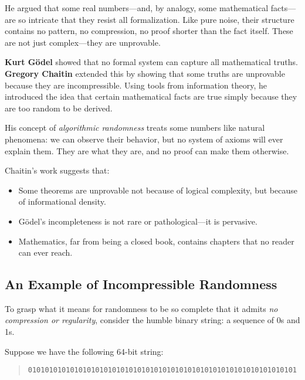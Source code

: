 He argued that some real numbers—and, by analogy, some mathematical facts—are so intricate that they resist all formalization. Like pure noise, their structure contains no pattern, no compression, no proof shorter than the fact itself. These are not just complex—they are unprovable.

\begin{tcolorbox}[colback=red!5!white, colframe=red!75!black, title={Sidebar: Chaitin, Gödel, and the Irreducible Truths of Mathematics}]
    \textbf{Kurt Gödel} showed that no formal system can capture all mathematical truths. \textbf{Gregory Chaitin} extended this by showing that some truths are unprovable because they are incompressible. Using tools from information theory, he introduced the idea that certain mathematical facts are true simply because they are too random to be derived.

    His concept of \emph{algorithmic randomness} treats some numbers like natural phenomena: we can observe their behavior, but no system of axioms will ever explain them. They are what they are, and no proof can make them otherwise.

    Chaitin’s work suggests that:
    \begin{itemize}
        \item Some theorems are unprovable not because of logical complexity, but because of informational density.
        \item Gödel’s incompleteness is not rare or pathological—it is pervasive.
        \item Mathematics, far from being a closed book, contains chapters that no reader can ever reach.
    \end{itemize}
\end{tcolorbox}


\subsection{An Example of Incompressible Randomness}

To grasp what it means for randomness to be so complete that it admits \emph{no compression or regularity}, consider the humble binary string: a sequence of 0s and 1s.

Suppose we have the following 64-bit string:

\begin{quote}
\texttt{0101010101010101010101010101010101010101010101010101010101010101}
\end{quote}

